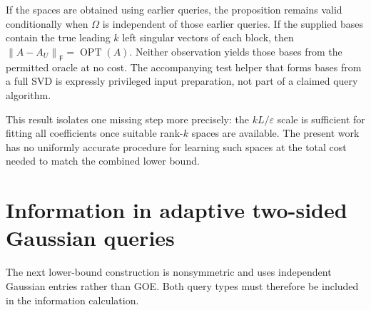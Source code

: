 \documentclass[11pt]{article}
\theoremstyle{remark}
\newcommand{\F}{\mathsf F}
\newcommand{\OPT}{\operatorname{OPT}}
\newcommand{\eps}{\varepsilon}
\newcommand{\norm}[1]{\left\lVert #1\right\rVert}
\begin{document}
If the spaces are obtained using earlier queries, the proposition remains
valid conditionally when $\Omega$ is independent of those earlier queries.
If the supplied bases contain the true leading $k$ left singular vectors of
each block, then $\norm{A-A_U}_\F=\OPT(A)$.
Neither observation yields those bases from the permitted oracle at no cost.
The accompanying test helper that forms bases from a full SVD is expressly
privileged input preparation, not part of a claimed query algorithm.

This result isolates one missing step more precisely: the $kL/\eps$ scale is
sufficient for fitting all coefficients once suitable rank-$k$ spaces are
available. The present work has no uniformly accurate procedure for learning
such spaces at the total cost needed to match the combined lower bound.



\section{Information in adaptive two-sided Gaussian queries}\label{sec:adaptive}

The next lower-bound construction is nonsymmetric and uses independent
Gaussian entries rather than GOE. Both query types must therefore be included
in the information calculation.
\end{document}
